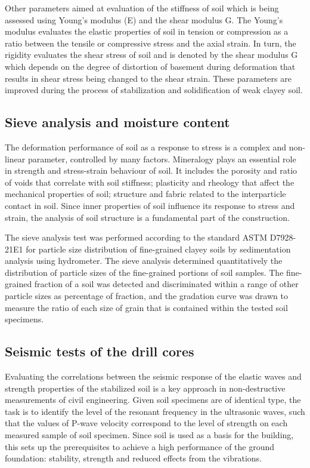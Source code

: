 \documentclass[USenglish,twocolumn]{article}
\begin{document}
Other parameters aimed at evaluation of the stiffness of soil which is being assessed using Young's modulus (E) and the shear modulus G. The Young's modulus evaluates the elastic properties of soil in tension or compression as a ratio between the tensile or compressive stress and the axial strain. In turn, the rigidity evaluates the shear stress of soil and is denoted by the shear modulus G which depends on the degree of distortion of basement during deformation that results in shear stress being changed to the shear strain. These parameters are improved during the process of stabilization and solidification of weak clayey soil.

\subsection{Sieve analysis and moisture content}
The deformation performance of soil as a response to stress is a complex and non-linear parameter, controlled by many factors. Mineralogy plays an essential role in strength and stress-strain behaviour of soil. It includes the porosity and ratio of voids that correlate with soil stiffness; plasticity and rheology that affect the mechanical properties of soil; structure and fabric related to the interparticle contact in soil. Since inner properties of soil influence its response to stress and strain, the analysis of soil structure is a fundamental part of the construction. 

The sieve analysis test was performed according to the standard ASTM D7928-21E1 \cite{D7928} for particle size distribution of fine-grained clayey soils by sedimentation analysis using hydrometer. The sieve analysis determined quantitatively the distribution of particle sizes of the fine-grained portions of soil samples. The fine-grained fraction of a soil was detected and discriminated within a range of other particle sizes as percentage of fraction, and the gradation curve was drawn to measure the ratio of each size of grain that is contained within the tested soil specimens. 

\subsection{Seismic tests of the drill cores}
Evaluating the correlations between the seismic response of the elastic waves and strength properties of the stabilized soil is a key approach in non-destructive measurements of civil engineering. Given soil specimens are of identical type, the task is to identify the level of the resonant frequency in the ultrasonic waves, such that the values of P-wave velocity correspond to the level of strength on each measured sample of soil specimen. Since soil is used as a basis for the building, this sets up the prerequisites to achieve a high performance of the ground foundation: stability, strength and reduced effects from the vibrations. 
\end{document}
